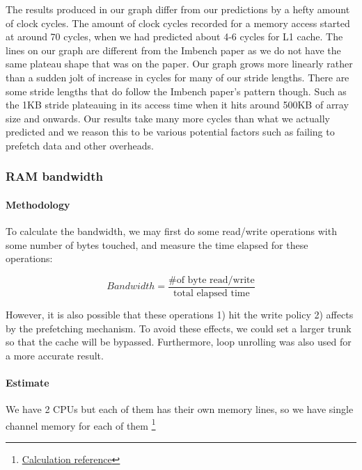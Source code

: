 The results produced in our graph differ from our predictions by a hefty amount of clock cycles. The amount of clock cycles recorded for a memory access started at around 70 cycles, when we had predicted about 4-6 cycles for L1 cache. The lines on our graph are different from the Imbench paper as we do not have the same plateau shape that was on the paper. Our graph grows more linearly rather than a sudden jolt of increase in cycles for many of our stride lengths. There are some stride lengths that do follow the Imbench paper's pattern though. Such as the 1KB stride plateauing in its access time when it hits around 500KB of array size and onwards. Our results take many more cycles than what we actually predicted and we reason this to be various potential factors such as failing to prefetch data and other overheads.
\\


\subsubsection{RAM bandwidth}
    
\paragraph{Methodology}

To calculate the bandwidth, we may first do some read/write operations with some number of bytes touched, and measure the time elapsed for these operations:

\begin{equation}
    Bandwidth = \frac{\text{\# of byte read/write}}{\text{total elapsed time}}
\end{equation}


However, it is also possible that these operations 1) hit the write policy 2) affects by the prefetching mechanism. To avoid these effects, we could set a larger trunk so that the cache will be bypassed. Furthermore, loop unrolling was also used for a more accurate result.

\paragraph{Estimate}

We have 2 CPUs but each of them has their own memory lines, so we have single channel memory for each of them \footnote{\href{https://www.intel.com/content/www/us/en/support/articles/000056722/processors/intel-core-processors.html}{Calculation reference}}


